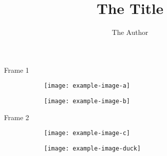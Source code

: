 \documentclass{beamer}
\title{The Title}
\author{The Author}
\begin{document}
                                                                                                                           

\begin{frame}{Frame 1}
  \begin{figure}
    \begin{subfigure}{0.45\paperwidth}
      \texttt{[image: example-image-a]}
      \caption{}
    \end{subfigure}%
    \begin{subfigure}{0.45\paperwidth}
      \texttt{[image: example-image-b]}
      \caption{}
    \end{subfigure}
  \caption{}
  \end{figure}
\end{frame}
\begin{frame}{Frame 2}
  \begin{figure}
    \ContinuedFloat
    \begin{subfigure}{0.45\paperwidth}
      \texttt{[image: example-image-c]}
      \caption{}
    \end{subfigure}%
    \begin{subfigure}{0.45\paperwidth}
      \texttt{[image: example-image-duck]}
      \caption{}
    \end{subfigure}
    \caption{}
  \end{figure}
\end{frame}                                                                                                                                   
\end{document}
